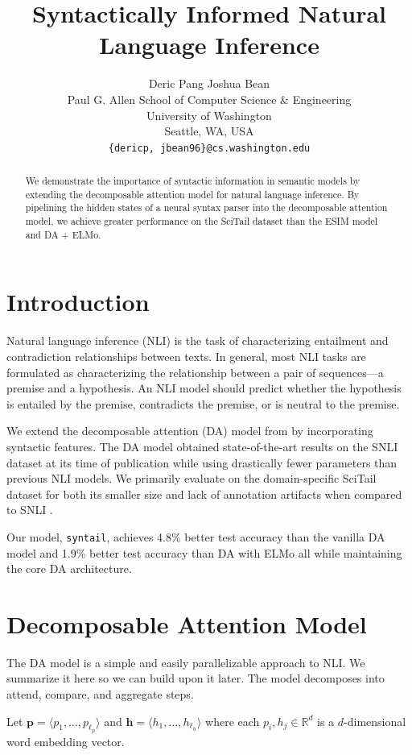\documentclass[11pt,a4paper]{article}
\title{Syntactically Informed Natural Language Inference}
\author{
  Deric Pang \quad
  Joshua Bean \\
  Paul G. Allen School of Computer Science \& Engineering \\
  University of Washington \\
  Seattle, WA, USA \\
  {\tt \{dericp, jbean96\}@cs.washington.edu} \\
}
\date{}
\begin{document}
\maketitle
\begin{abstract}
  We demonstrate the importance of syntactic information in semantic models by
  extending the decomposable attention model for natural language inference.
  By pipelining the hidden states of a neural syntax parser into the
  decomposable attention model, we achieve greater performance on the SciTail
  dataset than the ESIM model and DA + ELMo.
\end{abstract}

\section{Introduction}

Natural language inference (NLI) is the task of characterizing entailment and
contradiction relationships between texts.  In general, most NLI tasks are
formulated as characterizing the relationship between a pair of sequences---a
premise and a hypothesis. An NLI model should predict whether the hypothesis is
entailed by the premise, contradicts the premise, or is neutral to the premise.

We extend the decomposable attention (DA) model from
\citet{parikh2016decomposable} by incorporating syntactic features.  The DA
model obtained state-of-the-art results on the SNLI \citep{bowman2015large}
dataset at its time of publication while using drastically fewer parameters
than previous NLI models.  We primarily evaluate on the domain-specific SciTail
dataset \citep{Khot2018-th} for both its smaller size and lack of annotation
artifacts when compared to SNLI \citep{gururangan2018annotation}.

Our model, \texttt{syntail}, achieves 4.8\% better test accuracy than the
vanilla DA model and 1.9\% better test accuracy than DA with ELMo
\citep{peters2018deep} all while maintaining the core DA architecture.

\section{Decomposable Attention Model}

The DA model is a simple and easily parallelizable approach to NLI.  We
summarize it here so we can build upon it later.  The model decomposes into
attend, compare, and aggregate steps.

Let $\bm{p} = \langle p_1, \dots, p_{\ell_p} \rangle$ and $\bm{h} = \langle
h_1, \dots, h_{\ell_h} \rangle$ where each $p_i, h_j \in \mathbb{R}^d$ is a
$d$-dimensional word embedding vector.
\end{document}
